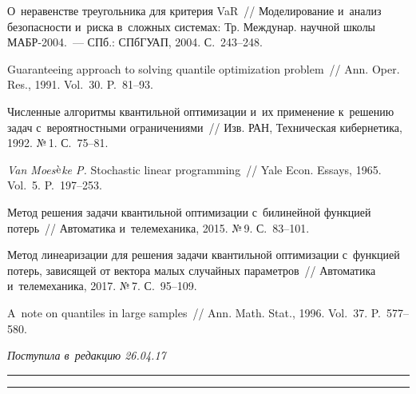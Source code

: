 \begin{multicols}{2}
{{\begin{thebibliography}{99}
О~неравенстве треугольника  для критерия VaR~//  
Моделирование и~анализ без\-опас\-ности и~рис\-ка в~слож\-ных сис\-те\-мах: 
Тр. Междунар. научной школы МАБР-2004.~--- СПб.: СПбГУАП,  2004. С.~243--248.



Guaranteeing approach to solving quantile optimization problem~// 
Ann. Oper. Res., 1991. Vol.~30. P.~81--93.

Численные алгоритмы квантильной оптимизации и~их применение к~решению 
задач с~вероятностными ограничениями~// Изв. РАН, Техническая кибернетика, 
1992. №\,1. С.~75--81.

{\it Van Moes$\Grave{\mbox{e}}$ke P.}
Stochastic linear programming~// Yale Econ. Essays, 1965. Vol.~5. P.~197--253.

Метод решения задачи квантильной оптимизации с~билинейной функцией потерь~// Автоматика
и~телемеханика, 
2015. №\,9. С.~83--101.

Метод линеаризации для решения задачи квантильной оптимизации с~функцией потерь, 
зависящей от вектора малых случайных параметров~// 
Автоматика
и~телемеханика, 2017. №\,7. С.~95--109.

A~note on quantiles in large samples~// Ann. Math. Stat., 
1996. Vol.~37. P.~577--580.

 \end{thebibliography}

 }
 }

\end{multicols}

\vspace*{-6pt}

\hfill{\small\textit{Поступила в~редакцию 26.04.17}}

\vspace*{6pt}



\hrule

\vspace*{2pt}

\hrule



